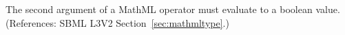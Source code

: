 The second argument of a MathML  operator must evaluate to
a boolean value.  (References: SBML L3V2 Section~\ref{sec:mathmltype}.)
